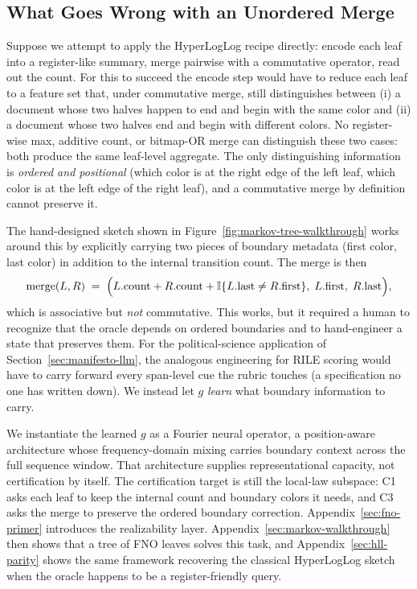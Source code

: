 \subsection{What Goes Wrong with an Unordered Merge}

Suppose we attempt to apply the HyperLogLog recipe directly: encode each
leaf into a register-like summary, merge pairwise with a commutative
operator, read out the count. For this to succeed the encode step would
have to reduce each leaf to a feature set that, under commutative merge,
still distinguishes between (i) a document whose two halves happen to end
and begin with the same color and (ii) a document whose two halves end
and begin with different colors. No register-wise max, additive count,
or bitmap-OR merge can distinguish these two cases: both produce the
same leaf-level aggregate. The only distinguishing information is
\emph{ordered and positional} (which color is at the right edge of the
left leaf, which color is at the left edge of the right leaf), and
a commutative merge by definition cannot preserve it.

The hand-designed sketch shown in Figure~\ref{fig:markov-tree-walkthrough}
works around this by explicitly carrying two pieces of boundary metadata
(first color, last color) in addition to the internal transition count.
The merge is then
\[
\text{merge}(L, R) \;=\; \Big(L.\text{count} + R.\text{count} + \mathbb{I}\{L.\text{last} \neq R.\text{first}\},\; L.\text{first},\; R.\text{last}\Big),
\]
which is associative but \emph{not} commutative. This works, but it
required a human to recognize that the oracle depends on ordered
boundaries and to hand-engineer a state that preserves them. For the
political-science application of Section~\ref{sec:manifesto-llm}, the
analogous engineering for RILE scoring would have to carry forward every
span-level cue the rubric touches (a specification no one has written
down). We instead let $g$ \emph{learn} what boundary information to carry.

We instantiate the learned $g$ as a Fourier neural operator, a position-aware architecture whose frequency-domain mixing carries boundary context across the full sequence window. That architecture supplies representational capacity, not certification by itself. The certification target is still the local-law subspace: C1 asks each leaf to keep the internal count and boundary colors it needs, and C3 asks the merge to preserve the ordered boundary correction. Appendix~\ref{sec:fno-primer} introduces the realizability layer. Appendix~\ref{sec:markov-walkthrough} then shows that a tree of FNO leaves solves this task, and Appendix~\ref{sec:hll-parity} shows the same framework recovering the classical HyperLogLog sketch when the oracle happens to be a register-friendly query.
